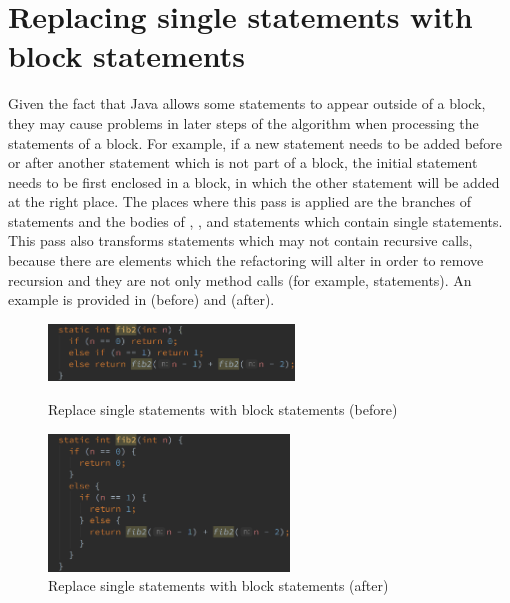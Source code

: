 \section{Replacing single statements with block statements}

Given the fact that Java allows some statements to appear outside of a block, they may cause problems in later steps of
the algorithm when processing the statements of a block. For example, if a new statement needs to be added before or
after another statement which is not part of a block, the initial statement needs to be first enclosed in a block, in
which the other statement will be added at the right place. The places where this pass is applied are the branches of
 statements and the bodies of , ,  and  statements
which contain single statements. This pass also transforms statements which may not contain recursive calls, because
there are elements which the refactoring will alter in order to remove recursion and they are not only method calls (for
example,  statements). An example is provided in 
(before) and  (after).

\begin{figure}[htb]
    \centering
    \begin{minipage}[b]{0.45\textwidth}
        \centering
        \includegraphics[height=0.6in]{src/img/replace-single-statements-with-block-statements-before.png}
        \caption{Replace single statements with block statements (before) \label{img:replace-single-statements-with-block-statements-before}}
    \end{minipage}
    \hfill
    \begin{minipage}[b]{0.45\textwidth}
        \centering
        \includegraphics[height=1.44in]{src/img/replace-single-statements-with-block-statements-after.png}
        \caption{Replace single statements with block statements (after) \label{img:replace-single-statements-with-block-statements-after}}
    \end{minipage}
\end{figure}